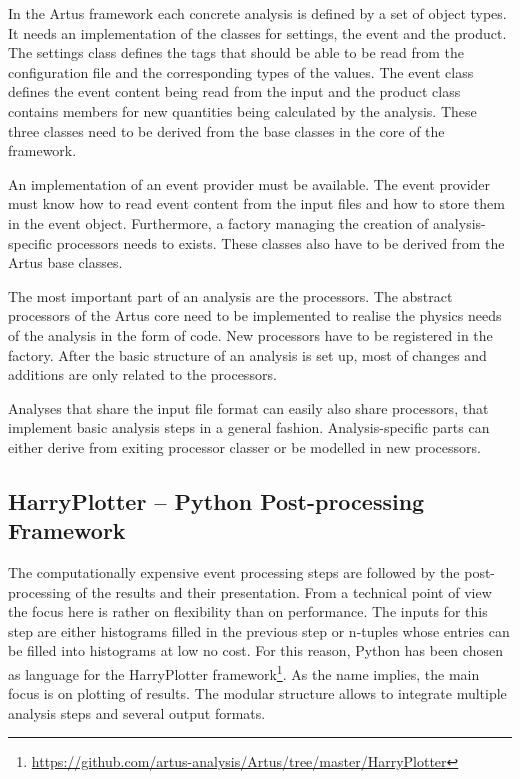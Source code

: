 \documentclass[a4paper, oneside, 10pt]{scrartcl}
\begin{document}
In the Artus framework each concrete analysis is defined by a set of object types. It needs an implementation of the classes for settings, the event and the product. The settings class defines the tags that should be able to be read from the configuration file and the corresponding types of the values. The event class defines the event content being read from the input and the product class contains members for new quantities being calculated by the analysis. These three classes need to be derived from the base classes in the core of the framework.

An implementation of an event provider must be available. The event provider must know how to read event content from the input files and how to store them in the event object. Furthermore, a factory managing the creation of analysis-specific processors needs to exists. These classes also have to be derived from the Artus base classes.

The most important part of an analysis are the processors. The abstract processors of the Artus core need to be implemented to realise the physics needs of the analysis in the form of code. New processors have to be registered in the factory. After the basic structure of an analysis is set up, most of changes and additions are only related to the processors.

Analyses that share the input file format can easily also share processors, that implement basic analysis steps in a general fashion. Analysis-specific parts can either derive from exiting processor classer or be modelled in new processors.


\subsection{HarryPlotter -- Python Post-processing Framework \label{section_artus_harryplotter}}

The computationally expensive event processing steps are followed by the post-processing of the results and their presentation. From a technical point of view the focus here is rather on flexibility than on performance. The inputs for this step are either histograms filled in the previous step or n-tuples whose entries can be filled into histograms at low no cost. For this reason, Python has been chosen as language for the HarryPlotter framework\footnote{\url{https://github.com/artus-analysis/Artus/tree/master/HarryPlotter}}. As the name implies, the main focus is on plotting of results. The modular structure allows to integrate multiple analysis steps and several output formats.
\end{document}
